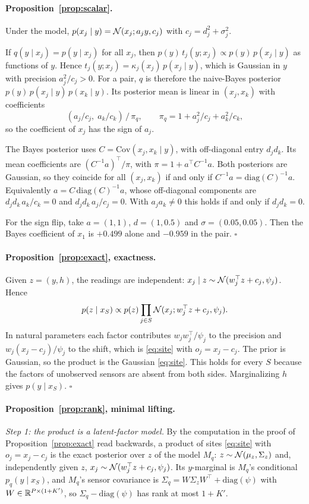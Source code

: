 \paragraph{Proposition~\ref{prop:scalar}.}
Under the model, $p(x_j\mid y)=\mathcal{N}(x_j;a_jy,c_j)$ with $c_j=d_j^2+\sigma_j^2$.

If $q(y\mid x_j)=p(y\mid x_j)$ for all $x_j$, then $p(y)\,t_j(y;x_j)\propto p(y)\,p(x_j\mid y)$ as functions of $y$.
Hence $t_j(y;x_j)=\kappa_j(x_j)\,p(x_j\mid y)$, which is Gaussian in $y$ with precision $a_j^2/c_j>0$. For a pair, $q$
is therefore the naive-Bayes posterior $p(y)\,p(x_j\mid y)\,p(x_k\mid y)$. Its posterior mean is linear in
$(x_j,x_k)$ with coefficients
\[
  (a_j/c_j,\;a_k/c_k)\,/\,\pi_q, \qquad \pi_q=1+a_j^2/c_j+a_k^2/c_k ,
\]
so the coefficient of $x_j$ has the sign of $a_j$.

The Bayes posterior uses $C=\mathrm{Cov}(x_j,x_k\mid y)$, with off-diagonal entry $d_jd_k$. Its mean coefficients are
$(C^{-1}a)^\top/\pi$, with $\pi=1+a^\top C^{-1}a$. Both posteriors are Gaussian, so they coincide for all $(x_j,x_k)$
if and only if $C^{-1}a=\mathrm{diag}(C)^{-1}a$. Equivalently $a=C\,\mathrm{diag}(C)^{-1}a$, whose off-diagonal
components are $d_jd_k\,a_k/c_k=0$ and $d_jd_k\,a_j/c_j=0$. With $a_ja_k\neq0$ this holds if and only if $d_jd_k=0$.

For the sign flip, take $a=(1,1)$, $d=(1,0.5)$ and $\sigma=(0.05,0.05)$. Then the Bayes coefficient of $x_1$ is
$+0.499$ alone and $-0.959$ in the pair. \hfill$\square$

\paragraph{Proposition~\ref{prop:exact}, exactness.}
Given $z=(y,h)$, the readings are independent: $x_j\mid z\sim\mathcal{N}(w_j^\top z+c_j,\psi_j)$. Hence
\[
  p(z\mid x_S)\propto p(z)\prod_{j\in S}\mathcal{N}(x_j;w_j^\top z+c_j,\psi_j).
\]
In natural parameters each factor contributes $w_jw_j^\top/\psi_j$ to the precision and $w_j(x_j-c_j)/\psi_j$ to the
shift, which is \eqref{eq:site} with $o_j=x_j-c_j$. The prior is Gaussian, so the product is the Gaussian
\eqref{eq:site}. This holds for every $S$ because the factors of unobserved sensors are absent from both sides.
Marginalizing $h$ gives $p(y\mid x_S)$. \hfill$\square$

\paragraph{Proposition~\ref{prop:rank}, minimal lifting.}
\emph{Step 1: the product is a latent-factor model.} By the computation in the proof of Proposition~\ref{prop:exact}
read backwards, a product of sites \eqref{eq:site} with $o_j=x_j-c_j$ is the exact posterior over $z$ of the model
$M_q$: $z\sim\mathcal{N}(\mu_z,\Sigma_z)$ and, independently given $z$, $x_j\sim\mathcal{N}(w_j^\top z+c_j,\psi_j)$. Its $y$-marginal is
$M_q$'s conditional $p_q(y\mid x_S)$, and $M_q$'s sensor covariance is $\Sigma_q=W\Sigma_zW^\top+\mathrm{diag}(\psi)$
with $W\in\mathbb{R}^{P\times(1+K')}$, so $\Sigma_q-\mathrm{diag}(\psi)$ has rank at most $1+K'$.

